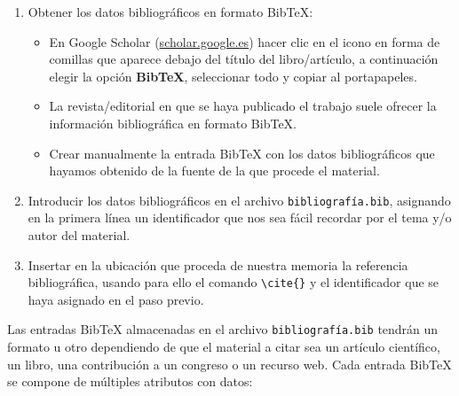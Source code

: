 \begin{enumerate}
    \item Obtener los datos bibliográficos en formato BibTeX:
          \begin{itemize}
              \item En Google Scholar (\url{scholar.google.es}) hacer clic en el icono en forma de comillas que aparece debajo del título del libro/artículo, a continuación elegir la opción \textbf{BibTeX}, seleccionar todo y copiar al portapapeles.

              \item La revista/editorial en que se haya publicado el trabajo suele ofrecer la información bibliográfica en formato BibTeX.

              \item Crear manualmente la entrada BibTeX con los datos bibliográficos que hayamos obtenido de la fuente de la que procede el material.
          \end{itemize}

    \item Introducir los datos bibliográficos en el archivo \texttt{bibliografía.bib}, asignando en la primera línea un identificador que nos sea fácil recordar por el tema y/o autor del material.

    \item Insertar en la ubicación que proceda de nuestra memoria la referencia bibliográfica, usando para ello el comando \verb|\cite{}| y el identificador que se haya asignado en el paso previo.
\end{enumerate}

Las entradas BibTeX almacenadas en el archivo \texttt{bibliografía.bib} tendrán un formato u otro dependiendo de que el material a citar sea un artículo científico, un libro, una contribución a un congreso o un recurso web. Cada entrada BibTeX se compone de múltiples atributos con datos:

